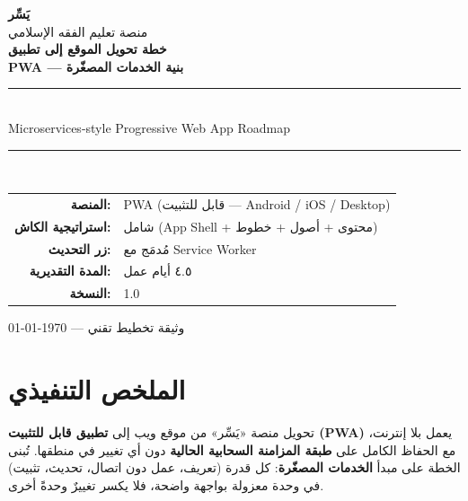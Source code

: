 \documentclass[11pt]{article}
\begin{document}
\begin{titlepage}
\centering
\vspace*{2.5cm}
{\Huge\bfseries\color{gold} يَسِّر}\\[0.4cm]
{\large\color{midgray} منصة تعليم الفقه الإسلامي}\\[2.5cm]

{\Huge\bfseries خطة تحويل الموقع إلى تطبيق}\\[0.6cm]
{\LARGE\bfseries PWA — بنية الخدمات المصغّرة}\\[1.2cm]

\rule{0.7\textwidth}{0.5pt}\\[0.8cm]
{\large Microservices-style Progressive Web App Roadmap}\\[0.8cm]
\rule{0.7\textwidth}{0.5pt}\\[2.5cm]

\begin{tabular}{r l}
\textbf{المنصة:}        & PWA (قابل للتثبيت — Android / iOS / Desktop) \\
\textbf{استراتيجية الكاش:} & شامل (App Shell + محتوى + أصول + خطوط) \\
\textbf{زر التحديث:}     & مُدمَج مع Service Worker \\
\textbf{المدة التقديرية:} & ٤.٥ أيام عمل \\
\textbf{النسخة:}         & 1.0 \\
\end{tabular}

\vfill
{\small\color{midgray} وثيقة تخطيط تقني — \today}
\end{titlepage}

\newpage
\tableofcontents
\newpage

\section{الملخص التنفيذي}

\begin{infobox}
تحويل منصة «يَسِّر» من موقع ويب إلى \textbf{تطبيق قابل للتثبيت (PWA)} يعمل بلا إنترنت، مع الحفاظ الكامل على
\textbf{طبقة المزامنة السحابية الحالية} دون أي تغيير في منطقها. تُبنى الخطة على مبدأ \textbf{الخدمات المصغّرة}:
كل قدرة (تعريف، عمل دون اتصال، تحديث، تثبيت) في وحدة معزولة بواجهة واضحة، فلا يكسر تغييرٌ وحدةً أخرى.
\end{infobox}
\end{document}
